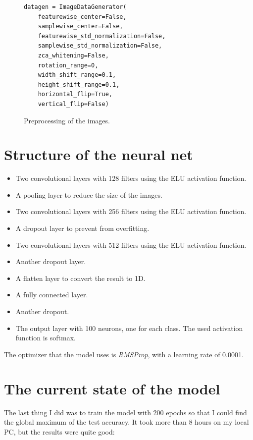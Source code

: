 \documentclass[12pt,spanish]{article}
\begin{document}
\begin{figure}[H]
\centering
\begin{verbatim}
datagen = ImageDataGenerator(
    featurewise_center=False,  
    samplewise_center=False,  
    featurewise_std_normalization=False,  
    samplewise_std_normalization=False, 
    zca_whitening=False,  
    rotation_range=0,
    width_shift_range=0.1,
    height_shift_range=0.1,
    horizontal_flip=True,  
    vertical_flip=False) 
\end{verbatim}
\caption{Preprocessing of the images.}
\end{figure}

\section{Structure of the neural net}

\begin{itemize}
	\item Two convolutional layers with 128 filters using the ELU activation function.
	\item A pooling layer to reduce the size of the images.
	\item Two convolutional layers with 256 filters using the ELU activation function.
	\item A dropout layer to prevent from overfitting.
	\item Two convolutional layers with 512 filters using the ELU activation function.
	\item Another dropout layer.
	\item A flatten layer to convert the result to 1D.
	\item A fully connected layer.
	\item Another dropout.
	\item The output layer with 100 neurons, one for each class. The used activation function is softmax.
\end{itemize}

The optimizer that the model uses is \emph{RMSProp}, with a learning rate of 0.0001.

\newpage

\section{The current state of the model}

The last thing I did was to train the model with 200 epochs so that I could find the global maximum of the test accuracy. It took more than 8 hours on my local PC, but the results were quite good:
\end{document}
